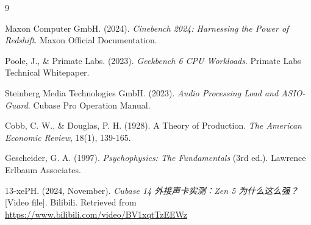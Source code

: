 \documentclass[11pt, a4paper]{article}
\begin{document}
\clearpage
\begin{thebibliography}{9}

Maxon Computer GmbH. (2024). \textit{Cinebench 2024: Harnessing the Power of Redshift}. Maxon Official Documentation.

Poole, J., \& Primate Labs. (2023). \textit{Geekbench 6 CPU Workloads}. Primate Labs Technical Whitepaper.

Steinberg Media Technologies GmbH. (2023). \textit{Audio Processing Load and ASIO-Guard}. Cubase Pro Operation Manual.

Cobb, C. W., \& Douglas, P. H. (1928). A Theory of Production. \textit{The American Economic Review}, 18(1), 139-165.

Gescheider, G. A. (1997). \textit{Psychophysics: The Fundamentals} (3rd ed.). Lawrence Erlbaum Associates.

13-xePH. (2024, November). \textit{Cubase 14 外接声卡实测：Zen 5 为什么这么强？} [Video file]. Bilibili. Retrieved from \url{https://www.bilibili.com/video/BV1xqtTzEEWz}

\end{thebibliography}
\end{document}
